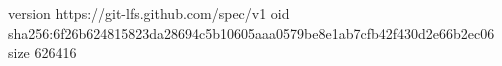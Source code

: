 version https://git-lfs.github.com/spec/v1
oid sha256:6f26b624815823da28694c5b10605aaa0579be8e1ab7cfb42f430d2e66b2ec06
size 626416
